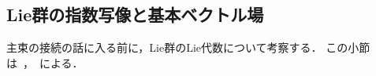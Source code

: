 \documentclass[TQFT_main]{subfiles}
\begin{document}


	


\subsection{Lie群の指数写像と基本ベクトル場}

主束の接続の話に入る前に，Lie群のLie代数について考察する．
この小節は~\cite[Chapter 20]{Lee2012smooth}，~\cite[第6章]{Imai2013diff}による．
\end{document}
